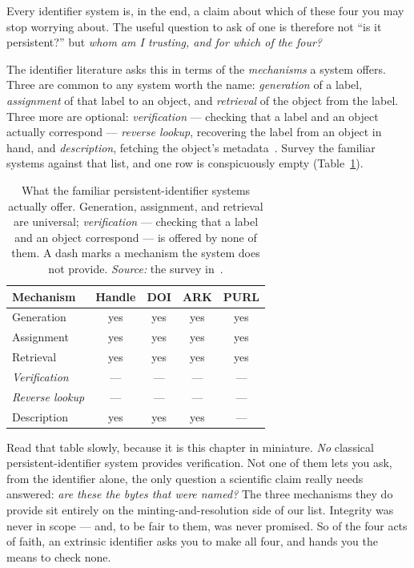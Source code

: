 \noindent Every identifier system is, in the end, a claim about which of these four you may stop
worrying about. The useful question to ask of one is therefore not \enquote{is it persistent?} but
\emph{whom am I trusting, and for which of the four?}

The identifier literature asks this in terms of the \emph{mechanisms} a system offers. Three are
common to any system worth the name: \emph{generation} of a label, \emph{assignment} of that label to
an object, and \emph{retrieval} of the object from the label. Three more are optional:
\emph{verification} --- checking that a label and an object actually correspond --- \emph{reverse
lookup}, recovering the label from an object in hand, and \emph{description}, fetching the object's
metadata~\autocite{swhipres2018}. Survey the familiar systems against that list, and one row is
conspicuously empty (Table~\ref{tab:mechanisms}).

\begin{table}[htbp]
  \centering\small
  \begin{tabular}{@{}lcccc@{}}
    \toprule
    \textbf{Mechanism} & \textbf{Handle} & \textbf{DOI} & \textbf{ARK} & \textbf{PURL} \\
    \midrule
    Generation             & yes & yes & yes & yes \\
    Assignment             & yes & yes & yes & yes \\
    Retrieval              & yes & yes & yes & yes \\
    \addlinespace
    \emph{Verification}    & --- & --- & --- & --- \\
    \emph{Reverse lookup}  & --- & --- & --- & --- \\
    Description            & yes & yes & yes & --- \\
    \bottomrule
  \end{tabular}
  \caption[Mechanisms offered by classical identifier systems]{What the familiar
  persistent-identifier systems actually offer. Generation, assignment, and retrieval are universal;
  \emph{verification} --- checking that a label and an object correspond --- is offered by none of
  them. A dash marks a mechanism the system does not provide. \emph{Source:} the survey
  in~\textcite{swhipres2018}.}
  \label{tab:mechanisms}
\end{table}

Read that table slowly, because it is this chapter in miniature. \emph{No} classical
persistent-identifier system provides verification. Not one of them lets you ask, from the identifier
alone, the only question a scientific claim really needs answered: \emph{are these the bytes that
were named?} The three mechanisms they do provide sit entirely on the minting-and-resolution side of
our list. Integrity was never in scope --- and, to be fair to them, was never promised. So of the
four acts of faith, an extrinsic identifier asks you to make all four, and hands you the means to
check none.

